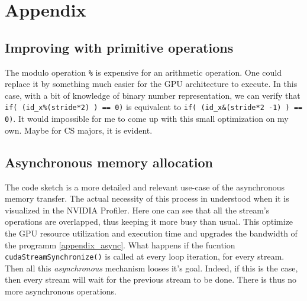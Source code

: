 \documentclass[12pt]{article}
\begin{document}
\section{Appendix}
\subsection*{Improving with primitive operations}\label{App.:Primitive operations}
The modulo operation \verb|%| is expensive for an arithmetic operation. One could replace it 
by something much easier for the GPU architecture to execute. In this case, with a bit of 
knowledge of binary number representation, we can verify that \verb|if( (id_x%(stride*2) ) == 0)| is 
equivalent to \verb|if( (id_x&(stride*2 -1) ) == 0)|. It would impossible for me to come up with this small 
optimization on my own. Maybe for CS majors, it is evident.

\subsection*{Asynchronous memory allocation}

The code sketch is a more detailed and relevant use-case of the 
asynchronous memory transfer. The actual necessity of this process in understood 
when it is visualized in the NVIDIA Profiler. Here one can see that 
all the stream's operations are overlapped, thus keeping it more busy than usual.
This optimize the GPU resource utilization and execution time and upgrades the
bandwidth of the programm \ref{appendix_async}. What happens if 
the fucntion \verb|cudaStreamSynchronize()| is called at every loop iteration,
for every stream. Then all this \textit{asynchronous} mechanism looses it's
goal. Indeed, if this is the case, then every stream will wait for the previous
stream to be done. There is thus no more asynchronous operations.

\begin{listing}
\inputminted[linenos=true, frame=single]{cuda}{cucodes/asyncmem.cu}
    \label{appendix_async}
\end{listing}









\newpage


\end{document}
